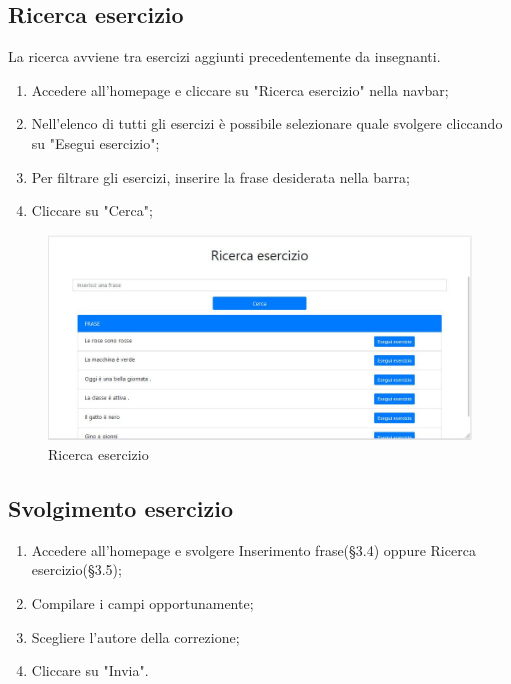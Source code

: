 \documentclass[11pt,a4paper]{article}
\begin{document}
{	\newpage
	\subsection{Ricerca esercizio}
	La ricerca avviene tra esercizi aggiunti precedentemente da insegnanti. 
	
	\begin{enumerate}
		\item Accedere all'homepage e cliccare su "Ricerca esercizio" nella navbar;
		\item Nell'elenco di tutti gli esercizi è possibile selezionare quale svolgere cliccando su "Esegui esercizio";
		\item Per filtrare gli esercizi, inserire la frase desiderata nella barra;
		\item Cliccare su "Cerca";
	\end{enumerate}
	
	\begin{figure}[h]
		\centering
		\includegraphics[scale=0.65]{images/ricerca.jpg}
		\caption{Ricerca esercizio}
	\end{figure}
	
	\subsection{Svolgimento esercizio}
	\begin{enumerate}
		\item Accedere all'homepage e svolgere Inserimento frase(\S3.4) oppure Ricerca esercizio(\S3.5);
		\item Compilare i campi opportunamente;
		\item Scegliere l'autore della correzione;
		\item Cliccare su "Invia".
	\end{enumerate}

}
\end{document}
